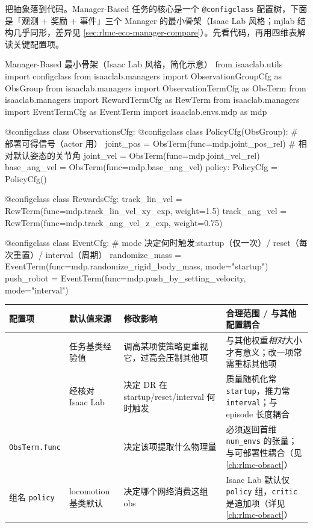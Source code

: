 把抽象落到代码。Manager-Based 任务的核心是一个 \verb|@configclass| 配置树，下面是「观测 + 奖励 + 事件」三个 Manager 的最小骨架（Isaac Lab 风格；mjlab 结构几乎同形，差异见 \cref{sec:rlmc-eco-manager-compare}）。先看代码，再用四维表解读关键配置项。

\begin{codebox}[Python]{Manager-Based 最小骨架（Isaac Lab 风格，简化示意）}
from isaaclab.utils import configclass
from isaaclab.managers import ObservationGroupCfg as ObsGroup
from isaaclab.managers import ObservationTermCfg as ObsTerm
from isaaclab.managers import RewardTermCfg as RewTerm
from isaaclab.managers import EventTermCfg as EventTerm
import isaaclab.envs.mdp as mdp

@configclass
class ObservationsCfg:
    @configclass
    class PolicyCfg(ObsGroup):                       # 部署可得信号（actor 用）
        joint_pos = ObsTerm(func=mdp.joint_pos_rel)  # 相对默认姿态的关节角
        joint_vel = ObsTerm(func=mdp.joint_vel_rel)
        base_ang_vel = ObsTerm(func=mdp.base_ang_vel)
    policy: PolicyCfg = PolicyCfg()

@configclass
class RewardsCfg:
    track_lin_vel = RewTerm(func=mdp.track_lin_vel_xy_exp, weight=1.5)
    track_ang_vel = RewTerm(func=mdp.track_ang_vel_z_exp, weight=0.75)

@configclass
class EventCfg:
    # mode 决定何时触发:startup（仅一次）/ reset（每次重置）/ interval（周期）
    randomize_mass = EventTerm(func=mdp.randomize_rigid_body_mass, mode="startup")
    push_robot = EventTerm(func=mdp.push_by_setting_velocity, mode="interval")
\end{codebox}

\begin{center}
\small
\begin{tabular}{@{}lp{2.6cm}p{3.0cm}p{3.4cm}@{}}
\toprule
配置项 & 默认值来源 & 修改影响 & 合理范围 / 与其他配置耦合 \\
\midrule
\Verb[breaklines]|RewTerm.weight| & 任务基类经验值\,\cite{rudin2021minutes} & 调高某项使策略更重视它，过高会压制其他项 & 与其他权重\emph{相对}大小才有意义；改一项常需重标其他项 \\
\Verb[breaklines]|EventTerm.mode| & 经核对 Isaac Lab\,\cite{mittal2025isaaclab} & 决定 DR 在 startup/reset/interval 何时触发 & 质量随机化常 \verb|startup|，推力常 \verb|interval|；与 episode 长度耦合 \\
\verb|ObsTerm.func| & \Verb[breaklines]|isaaclab.envs.mdp|\,\cite{mittal2025isaaclab} & 决定该项提取什么物理量 & 必须返回首维 \verb|num_envs| 的张量；与可部署性耦合（见 \cref{ch:rlmc-obsact}） \\
组名 \verb|policy| & locomotion 基类默认 & 决定哪个网络消费这组 obs & Isaac Lab 默认仅 \verb|policy| 组，\verb|critic| 是追加项（详见 \cref{ch:rlmc-obsact}） \\
\bottomrule
\end{tabular}
\end{center}

